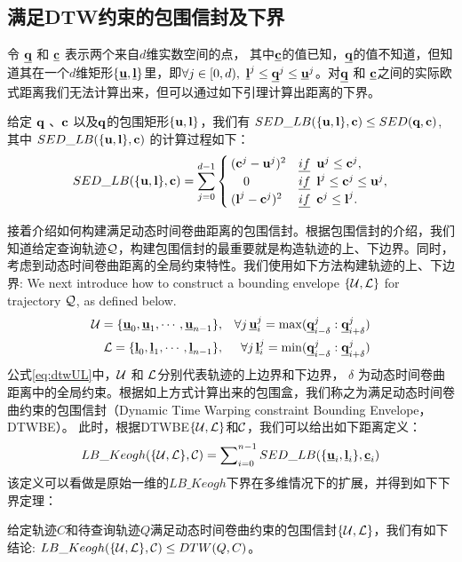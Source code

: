 \subsection{满足DTW约束的包围信封及下界} 
令 $\emph{{\textbf{q}}}$ 和 $\emph{{\textbf{c}}}$ 表示两个来自$d$维实数空间的点， 其中$\emph{{\textbf{c}}}$的值已知，$\emph{{\textbf{q}}}$的值不知道，但知道其在一个$d$维矩形$\{\emph{{\textbf{u}}}, \emph{{\textbf{l}}}\}$里，即$\forall j\in [0, d),  \,\, {\emph{{\textbf{l}}}}^{j}  \le \emph{{\textbf{q}}}^{j} \le \emph{{\textbf{u}}}^{j}$。对$\emph{{\textbf{q}}}$ 和 $\emph{{\textbf{c}}}$之间的实际欧式距离我们无法计算出来，但可以通过如下引理计算出距离的下界。
\begin{lemma}\label{theory:SEDLB}
	给定 $\textbf{q}$ 、$\textbf{c}$ 以及$\textbf{q}$的包围矩形$\{\textbf{u}, \textbf{l}\}$，我们有
	$SED\_LB(\{{\textbf{u}},\textbf{l} \},\textbf{c})\le SED(\textbf{q},\textbf{c})$, 其中 $SED\_LB(\{{\textbf{u}},\textbf{l} \},\textbf{c})$ 的计算过程如下：
	\allowdisplaybreaks
	\begin{equation}
	SED\_LB(\{{\textbf{u}},\textbf{l} \},\textbf{c}) =
	\sum_{j=0}^{d-1} \begin{cases}
	({\textbf{c}}^{j}- {\textbf{u}}^{j})^2 & \emph{if} \,\,\,   \textbf{u}^{j} \le {\textbf{c}}^{j},\\
	\quad 0 &   \emph{if} \,\,\,  \textbf{l}^{j} \le  {\textbf{c}}^{j} \le \textbf{u}^{j},\\
	({\textbf{l}}^{j} -{\textbf{c}}^{j})^2 & \emph{if} \,\,\,    {\textbf{c}}^{j} \le \textbf{l}^{j}.\\
	\end{cases}
	\end{equation}
	\allowdisplaybreaks[4]
\end{lemma}

接着介绍如何构建满足动态时间卷曲距离的包围信封。根据包围信封的介绍，我们知道给定查询轨迹$\cal Q$，构建包围信封的最重要就是构造轨迹的上、下边界。同时，考虑到动态时间卷曲距离的全局约束特性。我们使用如下方法构建轨迹的上、下边界:
We next introduce how to construct a bounding envelope $\{{\cal U},{\cal L}\}$ for trajectory $\cal Q$, as defined below. %
\begin{eqnarray}\label{eq:dtwUL}
{\cal U} = \{\emph{{\textbf{u}}}_{0},\emph{{\textbf{u}}}_{1},\cdots, \emph{{\textbf{u}}}_{n-1} \} &,& \forall j  \, \emph{{\textbf{u}}}_{i}^{j}=\max(\emph{{\textbf{q}}}_{i-\delta}^{j} : \emph{{\textbf{q}}}_{i+\delta}^{j}) \nonumber \\
{\cal L} = \{\emph{{\textbf{l}}}_{0},\emph{{\textbf{l}}}_{1},\cdots, \emph{{\textbf{l}}}_{n-1} \}&,& \forall j  \, \emph{{\textbf{l}}}_{i}^{j}=\min(\emph{{\textbf{q}}}_{i-\delta}^{j} : \emph{{\textbf{q}}}_{i+\delta}^{j})
\end{eqnarray}
公式\ref{eq:dtwUL}中，${\cal U}$ 和 ${\cal L}$分别代表轨迹的上边界和下边界， $\delta$ 为动态时间卷曲距离中的全局约束。根据如上方式计算出来的包围盒，我们称之为满足动态时间卷曲约束的包围信封（Dynamic Time Warping constraint Bounding Envelope，DTWBE）。
此时，根据DTWBE$\{{\cal U}, {\cal L}\}  $和$\cal C$，我们可以给出如下距离定义：
\begin{equation}\label{eq:LBKeogh}
LB\_Keogh({\{\cal U,\cal L\},{\cal C}})=  \sum\nolimits_{i=0}^{n-1}	SED\_LB(\{{\emph{{\textbf{u}}}_{i}},\emph{{\textbf{l}}}_{i} \},\emph{{\textbf{c}}}_{i})
\end{equation}
该定义可以看做是原始一维的$LB\_Keogh$下界在多维情况下的扩展，并得到如下下界定理：
\begin{theorem}\label{theorem:DTWLBK}
	给定轨迹$C$和待查询轨迹$Q$满足动态时间卷曲约束的包围信封$\{{\cal U}, {\cal L}\}$，我们有如下结论: $LB\_Keogh({\{\cal U,\cal L\},{\cal C}}) \le DTW(Q,C)$。
\end{theorem}


